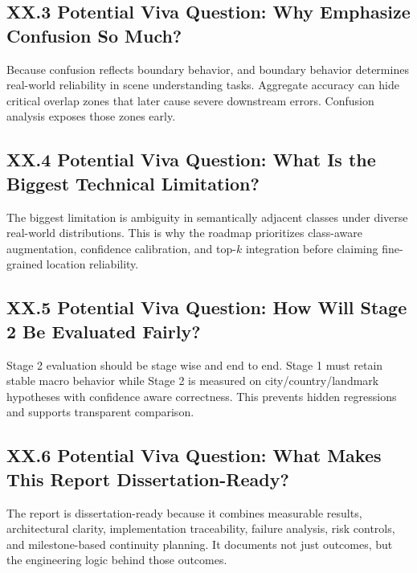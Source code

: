 \subsection*{XX.3 Potential Viva Question: Why Emphasize Confusion So Much?}
Because confusion reflects boundary behavior, and boundary behavior determines real-world reliability in scene understanding tasks. Aggregate accuracy can hide critical overlap zones that later cause severe downstream errors. Confusion analysis exposes those zones early.

\subsection*{XX.4 Potential Viva Question: What Is the Biggest Technical Limitation?}
The biggest limitation is ambiguity in semantically adjacent classes under diverse real-world distributions. This is why the roadmap prioritizes class-aware augmentation, confidence calibration, and top-$k$ integration before claiming fine-grained location reliability.

\subsection*{XX.5 Potential Viva Question: How Will Stage 2 Be Evaluated Fairly?}
Stage 2 evaluation should be stage wise and end to end. Stage 1 must retain stable macro behavior while Stage 2 is measured on city/country/landmark hypotheses with confidence aware correctness. This prevents hidden regressions and supports transparent comparison.

\subsection*{XX.6 Potential Viva Question: What Makes This Report Dissertation-Ready?}
The report is dissertation-ready because it combines measurable results, architectural clarity, implementation traceability, failure analysis, risk controls, and milestone-based continuity planning. It documents not just outcomes, but the engineering logic behind those outcomes.

